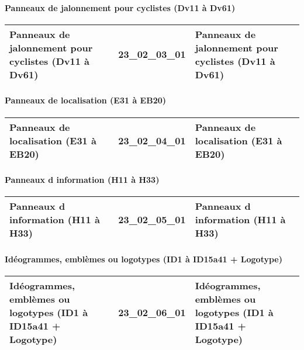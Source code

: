 \documentclass[12pt,titlepage]{book}
\begin{document}
\paragraph{Panneaux de jalonnement pour cyclistes (Dv11 à Dv61)}
\noindent
\vspace{\baselineskip}

\renewcommand{\arraystretch}{1.2}
\begin{supertabular}{|p{10cm}|c|p{15cm}|}
 Panneaux de jalonnement pour cyclistes (Dv11 à Dv61) & 23\_02\_03\_01 & Panneaux de jalonnement pour cyclistes (Dv11 à Dv61)\\
\hline
\end{supertabular}


\paragraph{Panneaux de localisation (E31 à EB20)}
\noindent
\vspace{\baselineskip}

\renewcommand{\arraystretch}{1.2}
\begin{supertabular}{|p{10cm}|c|p{15cm}|}
 Panneaux de localisation (E31 à EB20) & 23\_02\_04\_01 & Panneaux de localisation (E31 à EB20)\\
\hline
\end{supertabular}


\paragraph{Panneaux d information (H11 à H33)}
\noindent
\vspace{\baselineskip}

\renewcommand{\arraystretch}{1.2}
\begin{supertabular}{|p{10cm}|c|p{15cm}|}
 Panneaux d information (H11 à H33) & 23\_02\_05\_01 & Panneaux d information (H11 à H33)\\
\hline
\end{supertabular}


\paragraph{Idéogrammes, emblèmes ou logotypes (ID1 à ID15a41 + Logotype)}
\noindent
\vspace{\baselineskip}

\renewcommand{\arraystretch}{1.2}
\begin{supertabular}{|p{10cm}|c|p{15cm}|}
 Idéogrammes, emblèmes ou logotypes (ID1 à ID15a41 + Logotype) & 23\_02\_06\_01 & Idéogrammes, emblèmes ou logotypes (ID1 à ID15a41 + Logotype)\\
\hline
\end{supertabular}
\end{document}
